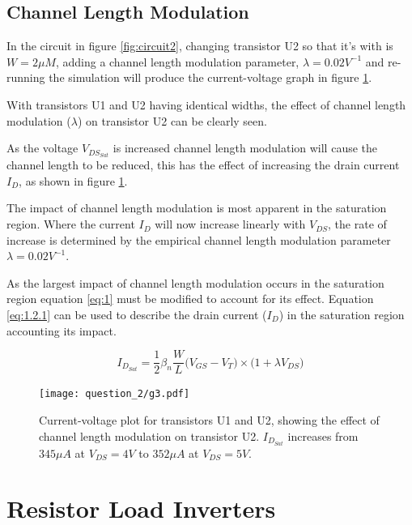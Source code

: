 \documentclass[11pt, a4paper]{article}
\begin{document}
\FloatBarrier
\subsection{Channel Length Modulation}
In the circuit in figure \ref{fig:circuit2}, changing transistor U2 so that it's with is $W = 2 \mu M$, adding a channel length modulation parameter, $\lambda = 0.02 V^{-1}$ and re-running the simulation will produce the current-voltage graph in figure \ref{fig:graph3}.

With transistors U1 and U2 having identical widths, the effect of channel length modulation ($\lambda$) on transistor U2 can be clearly seen.

As the voltage $V_{DS_{Sat}}$ is increased channel length modulation will cause the channel length to be reduced, this has the effect of increasing the drain current $I_ {D}$, as shown in figure \ref{fig:graph3}.

The impact of channel length modulation is most apparent in the saturation region. Where the current $I_{D}$ will now increase linearly with $V_{DS}$, the rate of increase is determined by the empirical channel length modulation parameter $\lambda = 0.02 V^{-1}$.

As the largest impact of channel length modulation occurs in the saturation region equation \ref{eq:1} must be modified to account for its effect. Equation \ref{eq:1.2.1} can be used to describe the drain current ($I_{D}$) in the saturation region accounting its impact.

\begin{equation}
    I_{D_{Sat}} = \frac{1}{2}\beta_{n}\frac{W}{L}\bigg(V_{GS} - V_T\bigg) \times \bigg(1 + \lambda V_{DS}\bigg)
    \label{eq:1.2.1}
\end{equation}




\begin{figure}
  \centering
  \texttt{[image: question\_2/g3.pdf]}
  \caption{\centering Current-voltage plot for transistors U1 and U2, showing the effect of channel length modulation on transistor U2. $I_{D_{Sat}}$ increases from $345 \mu A$ at $V_{DS} = 4V$ to $352 \mu A$ at $V_{DS} = 5V$.}
    \label{fig:graph3}
\end{figure}
\FloatBarrier

\newpage
\section{Resistor Load Inverters}
\end{document}
